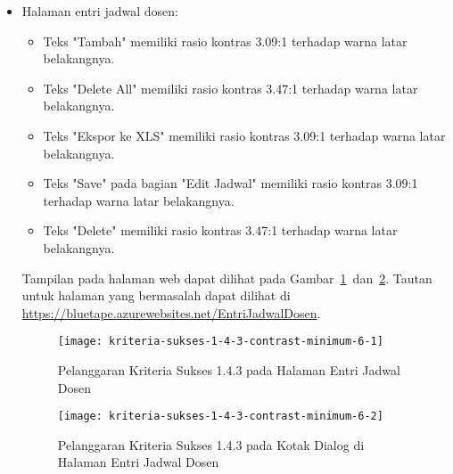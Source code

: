 \begin{itemize}
    \item Halaman entri jadwal dosen: 
    \begin{itemize}
        \item Teks "Tambah" memiliki rasio kontras 3.09:1 terhadap warna latar belakangnya.
        \item Teks "Delete All" memiliki rasio kontras 3.47:1 terhadap warna latar belakangnya.
        \item Teks "Ekspor ke XLS" memiliki rasio kontras 3.09:1 terhadap warna latar belakangnya.
        \item Teks "Save" pada bagian "Edit Jadwal" memiliki rasio kontras 3.09:1 terhadap warna latar belakangnya.
        \item Teks "Delete" memiliki rasio kontras 3.47:1 terhadap warna latar belakangnya.
    \end{itemize}
    Tampilan pada halaman web dapat dilihat pada \mbox{Gambar \ref{fig:1.4.3_contrast_minimum_6_1} dan \ref{fig:1.4.3_contrast_minimum_6_2}}. Tautan untuk halaman yang bermasalah dapat dilihat di \url{https://bluetape.azurewebsites.net/EntriJadwalDosen}.	
    \begin{figure}[H]
        \centering  
        \texttt{[image: kriteria-sukses-1-4-3-contrast-minimum-6-1]}  
        \caption[Pelanggaran Kriteria Sukses 1.4.3 pada Halaman Entri Jadwal Dosen]{Pelanggaran Kriteria Sukses 1.4.3 pada Halaman Entri Jadwal Dosen}
        \label{fig:1.4.3_contrast_minimum_6_1}  
    \end{figure} 
    
    \begin{figure}[H]
        \centering  
        \texttt{[image: kriteria-sukses-1-4-3-contrast-minimum-6-2]}  
        \caption[Pelanggaran Kriteria Sukses 1.4.3 pada Kotak Dialog di Halaman Entri Jadwal Dosen]{Pelanggaran Kriteria Sukses 1.4.3 pada Kotak Dialog di Halaman Entri Jadwal Dosen}
        \label{fig:1.4.3_contrast_minimum_6_2}  
    \end{figure} 


\end{itemize}
